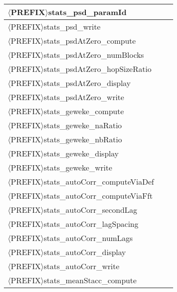 \begin{table}[!h]
\begin{center}
\begin{tabular}{|l|c|c|}
\hline
$\langle$PREFIX$\rangle$stats\_psd\_paramId               &         &             \\
\hline
$\langle$PREFIX$\rangle$stats\_psd\_write                 &         &             \\
\hline
\hline
$\langle$PREFIX$\rangle$stats\_psdAtZero\_compute         &         &             \\
\hline
$\langle$PREFIX$\rangle$stats\_psdAtZero\_numBlocks       &         &             \\
\hline
$\langle$PREFIX$\rangle$stats\_psdAtZero\_hopSizeRatio    &         &             \\
\hline
$\langle$PREFIX$\rangle$stats\_psdAtZero\_display         &         &             \\
\hline
$\langle$PREFIX$\rangle$stats\_psdAtZero\_write           &         &             \\
\hline
\hline
$\langle$PREFIX$\rangle$stats\_geweke\_compute            &         &             \\
\hline
$\langle$PREFIX$\rangle$stats\_geweke\_naRatio            &         &             \\
\hline
$\langle$PREFIX$\rangle$stats\_geweke\_nbRatio            &         &             \\
\hline
$\langle$PREFIX$\rangle$stats\_geweke\_display            &         &             \\
\hline
$\langle$PREFIX$\rangle$stats\_geweke\_write              &         &             \\
\hline
\hline
$\langle$PREFIX$\rangle$stats\_autoCorr\_computeViaDef    &         &             \\
\hline
$\langle$PREFIX$\rangle$stats\_autoCorr\_computeViaFft    &         &             \\
\hline
$\langle$PREFIX$\rangle$stats\_autoCorr\_secondLag        &         &             \\
\hline
$\langle$PREFIX$\rangle$stats\_autoCorr\_lagSpacing       &         &             \\
\hline
$\langle$PREFIX$\rangle$stats\_autoCorr\_numLags          &         &             \\
\hline
$\langle$PREFIX$\rangle$stats\_autoCorr\_display          &         &             \\
\hline
$\langle$PREFIX$\rangle$stats\_autoCorr\_write            &         &             \\
\hline
\hline
$\langle$PREFIX$\rangle$stats\_meanStacc\_compute         &         &             \\

\end{tabular}
\end{center}
\end{table}
